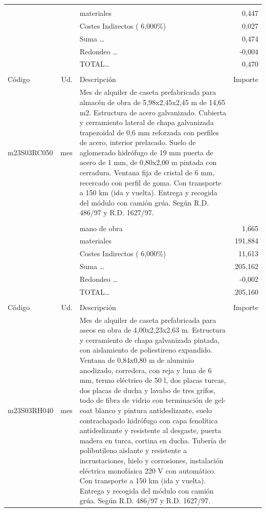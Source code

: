 \begin{supertabular}{l r p{60mm} r}
&&&\\%
&&materiales&     0,447\\%
&&Costes Indirectos (     6,000\%)&     0,027\\%
&&Suma \ldots&     0,474\\%
&&Redondeo \ldots&    {-}0,004\\%
%
&&TOTAL\ldots&     0,470\\%
&&&\\%
Código&Ud.&Descripción&Importe\\%
\hline%
m23S03RC050&mes&Mes de alquiler de caseta prefabricada para almacén de obra de 5,98x2,45x2,45 m de 14,65 m2. Estructura de acero galvanizado. Cubierta y cerramiento lateral de chapa galvanizada trapezoidal de 0,6 mm reforzada con perfiles de acero, interior prelacado. Suelo de aglomerado hidrófugo de 19 mm puerta de acero de 1 mm, de 0,80x2,00 m pintada con cerradura. Ventana fija de cristal de 6 mm, recercado con perfil de goma. Con transporte a 150 km (ida y vuelta). Entrega y recogida del módulo con camión grúa. Según R.D. 486/97 y R.D. 1627/97.&\\%
&&&\\%
&&mano de obra&     1,665\\%
&&materiales&   191,884\\%
&&Costes Indirectos (     6,000\%)&    11,613\\%
&&Suma \ldots&   205,162\\%
&&Redondeo \ldots&    {-}0,002\\%
%
&&TOTAL\ldots&   205,160\\%
&&&\\%
Código&Ud.&Descripción&Importe\\%
\hline%
m23S03RH040&mes&Mes de alquiler de caseta prefabricada para aseos en obra de 4,00x2,23x2,63 m. Estructura y cerramiento de chapa galvanizada pintada, con aislamiento de poliestireno expandido. Ventana de 0,84x0,80 m de aluminio anodizado, corredera, con reja y luna de 6 mm, termo eléctrico de 50 l, dos placas turcas, dos placas de ducha y lavabo de tres grifos, todo de fibra de vidrio con terminación de gel{-}coat blanco y pintura antideslizante, suelo contrachapado hidrófugo con capa fenolítica antideslizante y resistente al desgaste, puerta madera en turca, cortina en ducha. Tubería de polibutileno aislante y resistente a incrustaciones, hielo y corrosiones, instalación eléctrica monofásica 220 V con automático. Con transporte a 150 km (ida y vuelta). Entrega y recogida del módulo con camión grúa. Según R.D. 486/97 y R.D. 1627/97.&\\%

\end{supertabular}
